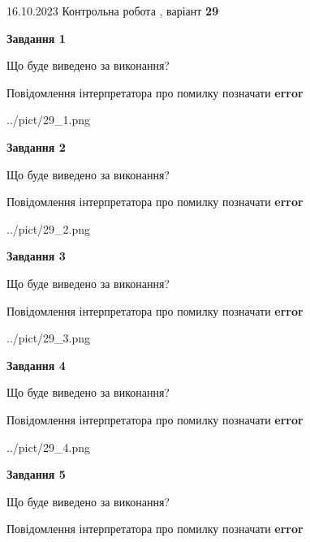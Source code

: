 \documentclass[12pt, ukrainian]{article}
\begin{document}
{\Large{16.10.2023 Контрольна робота , варіант  \No \textbf { 29 }\par}}
{
\begin {large}
{\begin {center}\textbf{Завдання 1}\end {center}}\par
Що буде виведено за виконання? \par
Повідомлення інтерпретатора про помилку позначати \textbf{error}

\begin{center}
	{../pict/29_1.png}
\end{center}
\newpage

{\begin {center}\textbf{Завдання 2}\end {center}}\par
Що буде виведено за виконання? \par
Повідомлення інтерпретатора про помилку позначати \textbf{error}

\begin{center}
	{../pict/29_2.png}
\end{center}
\newpage

{\begin {center}\textbf{Завдання 3}\end {center}}\par
Що буде виведено за виконання? \par
Повідомлення інтерпретатора про помилку позначати \textbf{error}

\begin{center}
	{../pict/29_3.png}
\end{center}
\newpage

{\begin {center}\textbf{Завдання 4}\end {center}}\par
Що буде виведено за виконання? \par
Повідомлення інтерпретатора про помилку позначати \textbf{error}

\begin{center}
	{../pict/29_4.png}
\end{center}
\newpage

{\begin {center}\textbf{Завдання 5}\end {center}}\par
Що буде виведено за виконання? \par
Повідомлення інтерпретатора про помилку позначати \textbf{error}


\end{large}}
\end{document}
